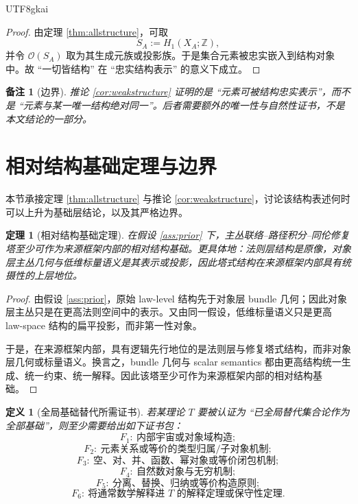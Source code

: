 \documentclass[12pt]{article}
\newtheorem{definition}{定义}[section]
\newtheorem{theorem}{定理}[section]
\newtheorem{remark}{备注}[section]
\newcommand{\ZZ}{\mathbb{Z}}
\begin{document}
\begin{CJK*}{UTF8}{gkai}
\begin{proof}
由定理 \ref{thm:allstructure}，可取
\[
S_A:=H_1(X_A;\ZZ),
\]
并令 $\mathcal O(S_A)$ 取为其生成元族或投影族。于是集合元素被忠实嵌入到结构对象中。故 ``一切皆结构'' 在 ``忠实结构表示'' 的意义下成立。
\end{proof}

\begin{remark}[边界]
推论 \ref{cor:weakstructure} 证明的是 ``元素可被结构忠实表示''，而不是 ``元素与某一唯一结构绝对同一''。后者需要额外的唯一性与自然性证书，不是本文结论的一部分。
\end{remark}

\section{相对结构基础定理与边界}
\label{sec:tex35-foundation}

本节承接定理 \ref{thm:allstructure} 与推论 \ref{cor:weakstructure}，讨论该结构表述何时可以上升为基础层结论，以及其严格边界。

\begin{theorem}[相对结构基础定理]\label{thm:relativefoundation}
在假设 \ref{ass:prior} 下，主丛联络--路径积分--同伦修复塔至少可作为来源框架内部的相对结构基础。更具体地：法则层结构是原像，对象层主丛几何与低维标量语义是其表示或投影，因此塔式结构在来源框架内部具有统摄性的上层地位。
\end{theorem}

\begin{proof}
由假设 \ref{ass:prior}，原始 law-level 结构先于对象层 bundle 几何；因此对象层主丛只是在更高法则空间中的表示。又由同一假设，低维标量语义只是更高 law-space 结构的扁平投影，而非第一性对象。

于是，在来源框架内部，具有逻辑先行地位的是法则层与修复塔式结构，而非对象层几何或标量语义。换言之，bundle 几何与 scalar semantics 都由更高结构统一生成、统一约束、统一解释。因此该塔至少可作为来源框架内部的相对结构基础。

\end{proof}

\begin{definition}[全局基础替代所需证书]
若某理论 $T$ 要被认证为 ``已全局替代集合论作为全部基础''，则至少需要给出如下证书包：
\[
F_1:\ \text{内部宇宙或对象域构造};
\]
\[
F_2:\ \text{元素关系或等价的类型归属/子对象机制};
\]
\[
F_3:\ \text{空、对、并、函数、幂对象或等价闭包机制};
\]
\[
F_4:\ \text{自然数对象与无穷机制};
\]
\[
F_5:\ \text{分离、替换、归纳或等价构造原则};
\]
\[
F_6:\ \text{将通常数学解释进 }T\text{ 的解释定理或保守性定理}.
\]
\end{definition}


\end{CJK*}
\end{document}
